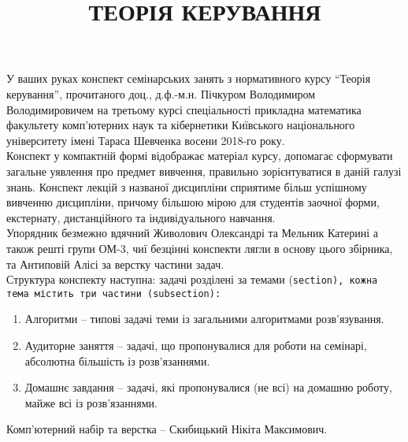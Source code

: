 \documentclass[a5paper, 10pt]{article}
\title{{\Huge ТЕОРІЯ КЕРУВАННЯ}}
\date{}
\theoremstyle{definition}
\numberwithin{equation}{section}
\begin{document}
\maketitle \thispagestyle{empty} \newpage 

У ваших руках конспект семінарських занять з нормативного курсу ``Теорія керування'', прочитаного доц., д.ф.-м.н. Пічкуром Володимиром Володимировичем на третьому курсі спеціальності прикладна математика факультету комп\-'ю\-тер\-них наук та кібернетики Київського національного університету імені Тараса Шевченка восени 2018-го року. \\

Конспект у компактній формі відображає матеріал курсу, допомагає сформувати загальне уявлення про предмет вивчення, правильно зорієнтуватися в даній галузі знань. Конспект лекцій з названої дисципліни сприятиме більш успішному вивченню дисципліни, причому більшою мірою для студентів заочної форми, екстернату, дистанційного та індивідуального навчання. \\

Упорядник безмежно вдячний Живолович Олександрі та Мельник Катерині а також решті групи ОМ-3, чиї безцінні конспекти лягли в основу цього збірника, та Антиповій Алісі за верстку частини задач. \\

Структура конспекту наступна: задачі розділені за темами (\tt{section}\normalfont), кожна тема містить три частини (\tt{subsection}\normalfont): 
\begin{enumerate}
	\item Алгоритми -- типові задачі теми із загальними алгоритмами розв'язування.
	\item Аудиторне заняття -- задачі, що пропонувалися для роботи на семінарі, абсолютна більшість із розв'язаннями.
	\item Домашнє завдання -- задачі, які пропонувалися (не всі) на домашню роботу, майже всі із розв'язаннями.
\end{enumerate}

Комп\-'ю\-тер\-ний набір та верстка -- Скибицький Нікіта Максимович.

\newpage

\tableofcontents \newpage

 \newpage
 \newpage
 \newpage

 \newpage
 \newpage
 \newpage

 \newpage
 \newpage
 \newpage

 \newpage
 \newpage
 \newpage

 \newpage
 \newpage
 \newpage

 \newpage
 \newpage
 \newpage

 \newpage
 \newpage
 \newpage

 \newpage
 \newpage

\end{document}
